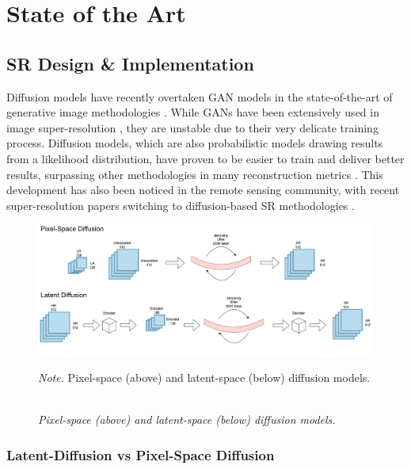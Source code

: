 \chapter{State of the Art}

\section{SR Design \& Implementation}
Diffusion \autocite{NEURIPS2020_4c5bcfec} models have recently overtaken GAN \autocite{NIPS2014_5ca3e9b1} models in the state-of-the-art of generative image methodologies \autocite{10081412}. While GANs have been extensively used in image super-resolution \autocite{9044873}, they are unstable due to their very delicate training process. Diffusion models, which are also probabilistic models drawing results from a likelihood distribution, have proven to be easier to train and deliver better results, surpassing other methodologies in many reconstruction metrics \autocite{saharia2021image}. This development has also been noticed in the remote sensing community, with recent super-resolution papers switching to diffusion-based SR methodologies \autocite{rs14194834, 10057005, 103389fmars20231211981}.

\begin{figure}[H]
    \caption{\doublespacing \\ \textit{Pixel-space (above) and latent-space (below) diffusion models.}} 
    \centering
    \includegraphics[width=1\linewidth]{images/lat_px_dif.png}
    \begin{justify}
        \textit{Note.} Pixel-space (above) and latent-space (below) diffusion models.
    \end{justify}                    
    \label{fig:pixel_latent_space}
\end{figure}

\subsection{Latent-Diffusion vs Pixel-Space Diffusion}

